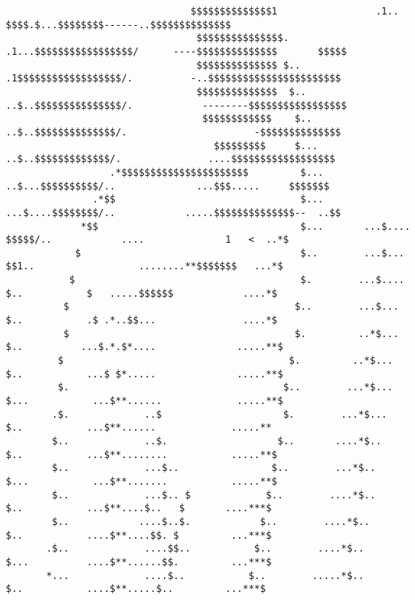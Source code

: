 \begin{verbatim}
                                $$$$$$$$$$$$$$1                 .1..  $$$$.$...$$$$$$$$------..$$$$$$$$$$$$$$
                                 $$$$$$$$$$$$$$$.               .1...$$$$$$$$$$$$$$$$$/      ----$$$$$$$$$$$$$$       $$$$$
                                 $$$$$$$$$$$$$$ $..             .1$$$$$$$$$$$$$$$$$$/.          -..$$$$$$$$$$$$$$$$$$$$$$$
                                 $$$$$$$$$$$$$$  $..           ..$..$$$$$$$$$$$$$$$/.            --------$$$$$$$$$$$$$$$$$
                                  $$$$$$$$$$$$    $..          ..$..$$$$$$$$$$$$$$/.                      -$$$$$$$$$$$$$$
                                    $$$$$$$$$     $...         ..$..$$$$$$$$$$$$$/.               ....$$$$$$$$$$$$$$$$$$
                  .*$$$$$$$$$$$$$$$$$$$$$$         $...        ..$...$$$$$$$$$$/..              ...$$$.....     $$$$$$$
               .*$$                                $...       ...$....$$$$$$$$/..            .....$$$$$$$$$$$$$$--  ..$$
             *$$                                   $...       ...$....  $$$$$/..            ....              1   <  ..*$
            $                                      $..        ...$...     $$1..                  ........**$$$$$$$   ...*$
           $                                       $.        ...$....       $..           $   .....$$$$$$            ....*$
          $                                       $..        ...$...        $..           .$ .*..$$...               ....*$
          $                                       $.         ..*$...        $..          ...$.*.$*....              .....**$
         $                                       $.         ..*$...         $..           ...$ $*.....              .....**$
         $.                                     $..        ...*$...         $...           ...$**......             .....**$
        .$.             ..$                     $.        ...*$...           $..           ...$**......             .....**
        $..             ..$.                   $..       ....*$..            $..           ...$**........           .....**$
        $..             ...$..                $..        ...*$..             $...           ...$**.......           .....**$
        $..             ...$.. $             $..        ....*$..              $..           ...$**....$..   $       ....***$
        $..            ....$..$.            $..        ....*$..               $..           ....$**....$$. $         ...***$
       .$..             ....$$..           $..        ....*$..                $...          ....$**......$$.         ...***$
       *...             ....$..           $..        .....*$..                 $..           ....$**.....$..         ...***$

\end{verbatim}
